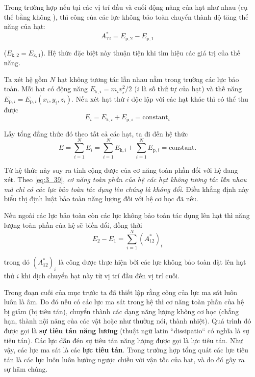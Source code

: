 Trong trường hợp nếu tại các vị trí đầu và cuối động năng của hạt như nhau (cụ thể bằng không ), thì công của các lực không bảo toàn chuyển thành độ tăng thế năng của hạt:
\begin{equation}\label{eq:3_38}
A_{12}^* = E_{\text{p},2} - E_{\text{p},1}
\end{equation}

\noindent
($E_{\text{k},2}=E_{\text{k},1}$). Hệ thức đặc biệt này thuận tiện khi tìm hiệu các giá trị của thế năng. 

Ta xét hệ gồm $N$ hạt không tương tác lẫn nhau nằm trong trường các lực bảo toàn. Mỗi hạt có động năng $E_{\text{k},i}=m_iv_i^2/2$ ($i$ là số thứ tự của hạt) và thế năng $E_{\text{p},i}=E_{\text{p},i}(x_i,y_i,z_i)$. Nếu xét hạt thứ $i$ độc lập với các hạt khác thì có thể thu được
\begin{equation*}
E_i = E_{\text{k},i} + E_{\text{p},i} = \text{constant}_i
\end{equation*}

\noindent
Lấy tổng đẳng thức đó theo tất cả các hạt, ta đi đến hệ thức
\begin{equation}\label{eq:3_39}
E = \sum_{i=1}^{N}E_i = \sum_{i=1}^{N}E_{\text{k},i} + \sum_{i=1}^{N}E_{\text{p},i} = \text{constant}.
\end{equation}

\noindent
Từ hệ thức này suy ra tính cộng được của cơ năng toàn phần đối với hệ đang xét.
Theo \eqref{eq:3_39}, \textit{cơ năng toàn phần của hệ các hạt không tương tác lẫn nhau mà chỉ có các lực bảo toàn tác dụng lên chúng là không đổi}. Điều khẳng định này biểu thị định luật bảo toàn năng lượng đối với hệ cơ học đã nêu.

Nếu ngoài các lực bảo toàn còn các lực không bảo toàn tác dụng lên hạt thì năng lượng toàn phần của hệ sẽ biến đổi, đồng thời
\begin{equation}\label{eq:3_40}
E_2 - E_1 = \sum_{i=1}^{N}(A_{12}^*)_i
\end{equation}

\noindent
trong đó $(A_{12}^*)_i$ là công được thực hiện bởi các lực không bảo toàn đặt lên hạt thứ $i$ khi dịch chuyển hạt này từ vị trí đầu đến vị trí cuối.

Trong đoạn cuối của mục trước ta đã thiết lập rằng công của lực ma sát luôn luôn là âm. Do đó nếu có các lực ma sát trong hệ thì cơ năng toàn phần của hệ bị giảm (bị tiêu tán), chuyển thành các dạng năng lượng không cơ học (chẳng hạn, thành nội năng của các vật hoặc như thường nói, thành nhiệt). Quá trình đó được gọi là \textbf{sự tiêu tán năng lương} (thuật ngữ latin ``dissipatio`` có nghĩa là sự tiêu tán). Các lực dẫn đén sự tiêu tán năng lượng được gọi là lực tiêu tán. Như vậy, các lực ma sát là các  \textbf{lực tiêu tán}. Trong trường hợp tổng quát các lực tiêu tán là các lực luôn luôn hướng ngược chiều với vận tốc của hạt, và do đó gây ra sự hãm chúng. 

